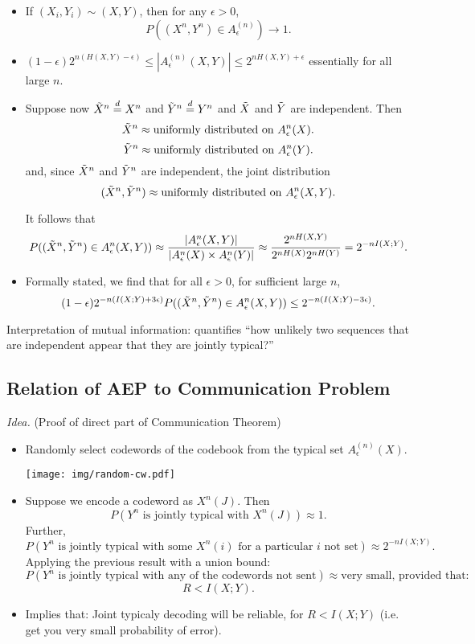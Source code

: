 \documentclass[12pt]{extarticle}
\newcommand{\eps}{\epsilon}
\newcommand{\T}{\text}
\begin{document}
\begin{itemize}
  \item If $(X_i, Y_i) \sim (X, Y)$, then for any $\epsilon > 0$,
\[
  P((X^n, Y^n)  \in A_{\eps}^{(n)} ) \to 1.
\]

\item $ (1- \epsilon) 2^{n (H(X, Y) - \epsilon)} \leq |A_{\eps}^{(n)} (X, Y)| \leq 2^{nH(X, Y) + \epsilon}$ essentially for all large $n$.

\def\eqd{\stackrel{d}{=}}

\item Suppose now $\tilde{X}^n \stackrel{d}{=} X^n$ and $\Yt^n \eqd Y^n$ and $\tilde{X}$ and $\tilde{Y}$ are independent.  Then
  \[
    \Xt^n \approx \T{uniformly distributed on } A_{\eps}^{n}(X).
  \]
  \[
      \Yt^n \approx \T{uniformly distributed on } A_{\eps}^{n} (Y).
    \]
    and, since $\tilde{X}^n$ and $\tilde{Y}^n$ are independent, the joint distribution
    \[
      (\Xt^n, \Yt^n) \approx \T{uniformly distributed on } A_{\eps}^{n} (X, Y).
    \]

    It follows that
    \[
      P( (\Xt^n, \Yt^n) \in A_{\eps}^{n} (X, Y)) \approx \frac{|A_{\eps}^{n} (X, Y)|}{|A_{\eps}^{n}(X) \times A_{\eps}^{n} (Y)|} \approx \frac{2^{n H(X, Y)}}{2^{n H(X)} 2^{n H(Y)}} = 2^{-n I(X; Y)}.
    \]

  \item Formally stated, we find that for all $\eps > 0$, for sufficient large $n$,
    \[
      (1 - \eps) 2^{-n (I (X; Y) + 3 \eps)}P( (\Xt^n, \Yt^n) \in A_{\eps}^{n} (X, Y)) \leq 2^{-n (I(X; Y) - 3 \eps)}.
    \]
\end{itemize}

Interpretation of mutual information: quantifies ``how unlikely two sequences that are independent appear that they are jointly typical?''

\subsection{Relation of AEP to Communication Problem}

{\it Idea.} (Proof of direct part of Communication Theorem)

\begin{itemize}
  \item Randomly select codewords of the codebook from the typical set $A_{\eps}^{(n)}(X)$.


    \texttt{[image: img/random-cw.pdf]}

  \item Suppose we encode a codeword as $X^n(J)$.  Then
    \[
      P(\T{$Y^n$ is jointly typical with $X^n(J)$} ) \approx 1.
    \]
    Further,
    \[
      P(\T{$Y^n$ is jointly typical with some $X^n(i)$ for a particular $i$ not set}) \approx 2^{-n I(X; Y)}.
    \]
    Applying the previous result with a union bound:
    \[
      P(\T{$Y^n$ is jointly typical with any of the codewords not sent}) \approx \text{very small, provided that:}
    \]
    \[
      R < I(X; Y).
    \]
  \item Implies that: Joint typicaly decoding will be reliable, for $R < I(X; Y)$ (i.e. get you very small probability of error).
\end{itemize}
\end{document}
